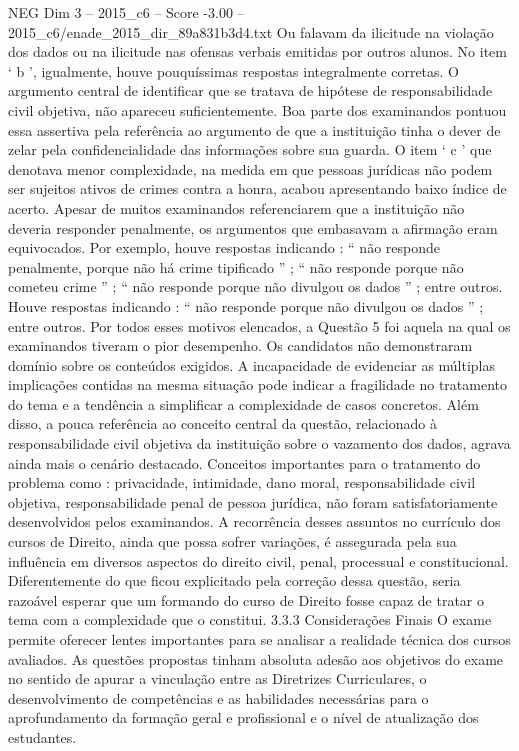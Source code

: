 \begin{textsample}{NEG Dim 3 – 2015\_c6 – Score -3.00 – 2015\_c6/enade\_2015\_dir\_89a831b3d4.txt}
Ou falavam da ilicitude na violação dos dados ou na ilicitude nas ofensas verbais emitidas por outros alunos.
No item ‘ b ’, igualmente, houve pouquíssimas respostas integralmente corretas.
O argumento central de identificar que se tratava de hipótese de responsabilidade civil objetiva, não apareceu suficientemente.
Boa parte dos examinandos pontuou essa assertiva pela referência ao argumento de que a instituição tinha o dever de zelar pela confidencialidade das informações sobre sua guarda.
O item ‘ c ’ que denotava menor complexidade, na medida em que pessoas jurídicas não podem ser sujeitos ativos de crimes contra a honra, acabou apresentando baixo índice de acerto.
Apesar de muitos examinandos referenciarem que a instituição não deveria responder penalmente, os argumentos que embasavam a afirmação eram equivocados.
Por exemplo, houve respostas indicando : “ não responde penalmente, porque não há crime tipificado ” ; “ não responde porque não cometeu crime ” ; “ não responde porque não divulgou os dados ” ; entre outros.
Houve respostas indicando : “ não responde porque não divulgou os dados ” ; entre outros.
Por todos esses motivos elencados, a Questão 5 foi aquela na qual os examinandos tiveram o pior desempenho.
Os candidatos não demonstraram domínio sobre os conteúdos exigidos.
A incapacidade de evidenciar as múltiplas implicações contidas na mesma situação pode indicar a fragilidade no tratamento do tema e a tendência a simplificar a complexidade de casos concretos.
Além disso, a pouca referência ao conceito central da questão, relacionado à responsabilidade civil objetiva da instituição sobre o vazamento dos dados, agrava ainda mais o cenário destacado.
Conceitos importantes para o tratamento do problema como : privacidade, intimidade, dano moral, responsabilidade civil objetiva, responsabilidade penal de pessoa jurídica, não foram satisfatoriamente desenvolvidos pelos examinandos.
A recorrência desses assuntos no currículo dos cursos de Direito, ainda que possa sofrer variações, é assegurada pela sua influência em diversos aspectos do direito civil, penal, processual e constitucional.
Diferentemente do que ficou explicitado pela correção dessa questão, seria razoável esperar que um formando do curso de Direito fosse capaz de tratar o tema com a complexidade que o constitui. 3.3.3 Considerações Finais O exame permite oferecer lentes importantes para se analisar a realidade técnica dos cursos avaliados.
As questões propostas tinham absoluta adesão aos objetivos do exame no sentido de apurar a vinculação entre as Diretrizes Curriculares, o desenvolvimento de competências e as habilidades necessárias para o aprofundamento da formação geral e profissional e o nível de atualização dos estudantes.

\end{textsample}

